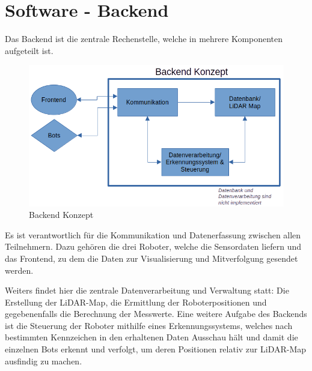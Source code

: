 

\chapter{Software - Backend}
\label{sec:software_backend}
Das Backend ist die zentrale Rechenstelle, 
welche in mehrere Komponenten aufgeteilt ist.

\begin{figure}[H]
    \includegraphics[width=\textwidth, center]{img/backend-konzept.png}
    \caption{Backend Konzept}
    \label{fig:backend_konzept}
\end{figure}

Es ist verantwortlich für die Kommunikation und Datenerfassung 
zwischen allen Teilnehmern. 
Dazu gehören die drei Roboter, welche die Sensordaten liefern
und das Frontend, 
zu dem die Daten zur Visualisierung und Mitverfolgung gesendet werden.

Weiters findet hier die zentrale Datenverarbeitung und Verwaltung statt: 
Die Erstellung der LiDAR-Map, 
die Ermittlung der Roboterpositionen und gegebenenfalls die Berechnung der Messwerte. 
Eine weitere Aufgabe des Backends 
ist die Steuerung der Roboter mithilfe eines Erkennungssystems, 
welches nach bestimmten Kennzeichen in den erhaltenen Daten Ausschau hält 
und damit die einzelnen Bots erkennt und verfolgt, 
um deren Positionen relativ zur LiDAR-Map ausfindig zu machen.
% 

